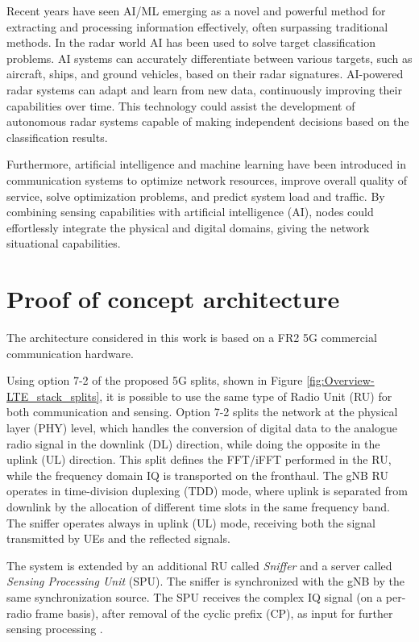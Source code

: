	Recent years have seen AI/ML emerging as a novel and powerful method for extracting and processing information effectively, often surpassing traditional methods.
	In the radar world AI has been used to solve target classification problems. 
	AI systems can accurately differentiate between various targets, such as aircraft, ships, and ground vehicles, based on their radar signatures. 
	AI-powered radar systems can adapt and learn from new data, continuously improving their capabilities over time. 
	This technology could assist the development of autonomous radar systems capable of making independent decisions based on the classification results. 
	
	 Furthermore, artificial intelligence and machine learning have been introduced in communication systems to optimize network resources, improve overall quality of service, solve optimization problems, and predict system load and traffic. 
	 By combining sensing capabilities with artificial intelligence (AI), nodes could effortlessly integrate the physical and digital domains, giving the network situational capabilities.
	


\section{Proof of concept architecture}
	\label{sec:intro-PoCarchitecture}
	
	The architecture considered in this work is based on a FR2 5G commercial communication hardware.
	
	Using option 7-2 of the proposed 5G splits, shown in Figure \ref{fig:Overview-LTE_stack_splits}, it is possible to use the same type of Radio Unit (RU) for both communication and sensing.
	Option 7-2 splits the network at the physical layer (PHY) level, which handles the conversion of digital data to the analogue radio signal in the downlink (DL) direction, while doing the opposite in the uplink (UL) direction.
	This split defines the FFT/iFFT performed in the RU, while the frequency domain IQ is transported on the fronthaul.
	The gNB RU operates in time-division duplexing (TDD) mode, where uplink is separated from downlink by the allocation of different time slots in the same frequency band. 	
	The sniffer operates always in uplink (UL) mode, receiving both the signal transmitted by UEs and the reflected signals. 
	
	The system is extended by an additional RU called \textit{Sniffer} and a server called \textit{Sensing Processing Unit} (SPU). 
	The sniffer is synchronized with the gNB by the same synchronization source. 
	The SPU receives the complex IQ signal (on a per-radio frame basis),  after removal of the cyclic prefix (CP), as input for further sensing processing \cite{Wild_Grudnitsky_Mandelli_Henninger_Guan_Schaich_2023}.
	
